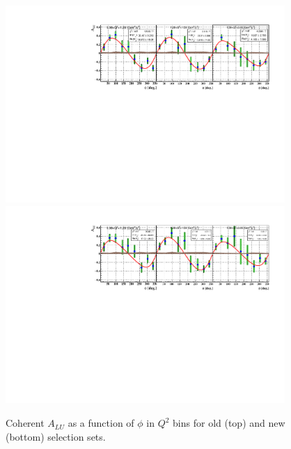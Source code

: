\begin{figure}[h!]
\centering
\includegraphics[height=7.5cm]{old_plots/f_coh_alu_Q2_phi.pdf}
\includegraphics[height=7.5cm]{new_plots/Coh_ALU_Q2_phi.pdf}
\caption{Coherent $A_{LU}$ as a function of $\phi$ in $Q^{2}$ bins for old 
(top) and new (bottom) selection sets.}
\label{fig:ALU_Q2_phi}
\end{figure}


